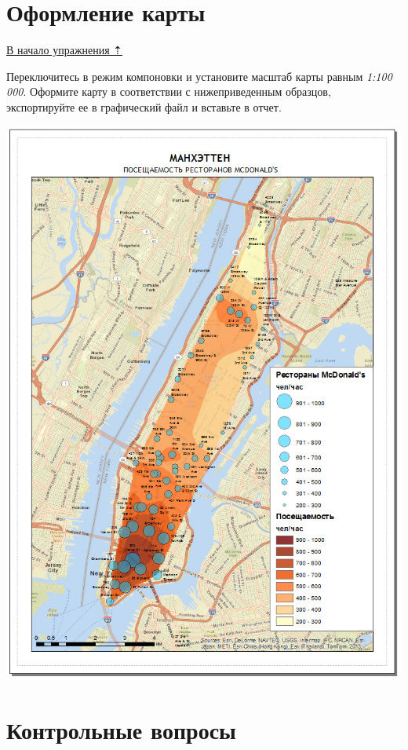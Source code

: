 \documentclass[12pt,]{book}
\begin{document}
\hypertarget{geocoding-design}{%
\section{Оформление карты}\label{geocoding-design}}

\protect\hyperlink{geocoding}{В начало упражнения ⇡}

Переключитесь в режим компоновки и установите масштаб карты равным \emph{1:100 000}. Оформите карту в соответствии с нижеприведенным образцов, экспортируйте ее в графический файл и вставьте в отчет.

\includegraphics{images/Ex09/image27.png}

\hypertarget{geocoding-questions}{%
\section{Контрольные вопросы}\label{geocoding-questions}}
\end{document}
